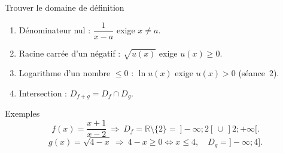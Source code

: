 \documentclass[10pt,aspectratio=169]{beamer}
\numberwithin{dummy}{section}
\newcommand{\R}{\mathbb{R}}
\begin{document}
\begin{frame}{Trouver le domaine de définition}
\begin{boxmethode}
\begin{enumerate}
    \item Dénominateur nul : $\dfrac{1}{x-a}$ exige $x\neq a$.
    \item Racine carrée d'un négatif : $\sqrt{u(x)}$ exige $u(x)\geqslant 0$.
    \item Logarithme d'un nombre $\leqslant 0$ : $\ln u(x)$ exige $u(x)>0$ (séance~2).
    \item Intersection : $D_{f+g}=D_f\cap D_g$.
\end{enumerate}
\end{boxmethode}

\vspace{0.3em}
\begin{exampleblock}{Exemples}
\[
f(x)=\frac{x+1}{x-2}\ \Rightarrow\ D_f=\R\setminus\{2\}=\ ]{-}\infty;2[\,\cup\,]2;+\infty[.
\]
\[
g(x)=\sqrt{4-x}\ \Rightarrow\ 4-x\geqslant 0 \iff x\leqslant 4,\quad D_g=]{-}\infty;4].
\]
\end{exampleblock}
\end{frame}
\end{document}
